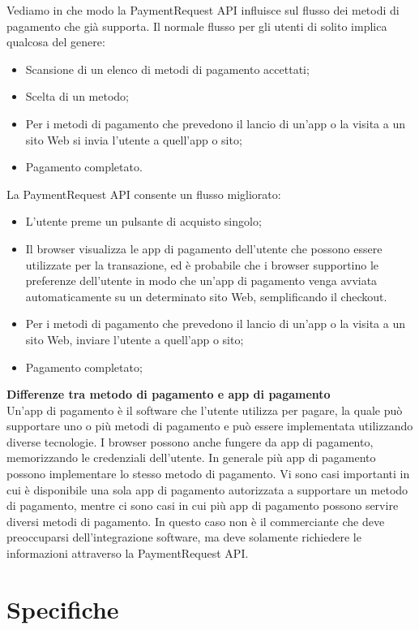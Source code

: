 \documentclass[11pt ,a4paper , twoside , openright ]{book}
\begin{document}
	Vediamo in che modo la PaymentRequest API influisce sul flusso dei metodi di pagamento che già supporta. Il normale flusso per gli utenti di solito implica qualcosa del genere:
	\begin{itemize}
		\item Scansione di un elenco di metodi di pagamento accettati;
		\item Scelta di un metodo;
		\item Per i metodi di pagamento che prevedono il lancio di un'app o la visita a un sito Web si invia l'utente a quell'app o sito;
		\item Pagamento completato.
	\end{itemize}
	La PaymentRequest API consente un flusso migliorato:
	\begin{itemize}
		\item L'utente preme un pulsante di acquisto singolo;
		\item Il browser visualizza le app di pagamento dell'utente che possono essere utilizzate per la transazione, ed è probabile che i browser supportino le preferenze dell'utente in modo che un'app di pagamento venga avviata automaticamente su un determinato sito Web, semplificando il checkout.
		\item Per i metodi di pagamento che prevedono il lancio di un'app o la visita a un sito Web, inviare l'utente a quell'app o sito; 
		\item Pagamento completato; 
	\end{itemize}
	\textbf{Differenze tra metodo di pagamento e app di pagamento}
	\\
	Un'app di pagamento è il software che l'utente utilizza per pagare, la quale può supportare uno o più metodi di pagamento e può essere implementata utilizzando diverse tecnologie. I browser possono anche fungere da app di pagamento, memorizzando le credenziali dell'utente. In generale più app di pagamento possono implementare lo stesso metodo di pagamento. 
	Vi sono casi importanti in cui è disponibile una sola app di pagamento autorizzata a supportare un metodo di pagamento, mentre ci sono casi in cui più app di pagamento possono servire diversi metodi di pagamento. In questo caso non è il commerciante che deve preoccuparsi dell'integrazione software, ma deve solamente richiedere le informazioni attraverso la PaymentRequest API.
	
	\section{Specifiche}
\end{document}
